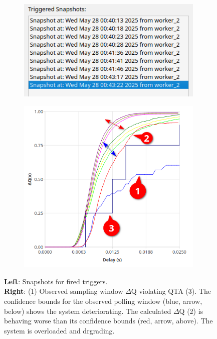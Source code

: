         \begin{figure}[H]
            \centering
            \begin{subfigure}{.5\textwidth}
                \centering
                \includegraphics[width=0.98\textwidth]{img/overload_2/snapshots.png}
                \label{fig:high_load_1}
            \end{subfigure}%
            \begin{subfigure}{.5\textwidth}
                \centering
                \includegraphics[width =0.98\textwidth]{img/overload_2/qta_triggerd2.png}
                \label{fig:high_load_2}
            \end{subfigure}
            \caption{\textbf{Left}: Snapshots for fired triggers. \\
            \textbf{Right}: (1) Observed sampling window $\Delta$Q violating QTA (3). The confidence bounds for the observed polling window (blue, arrow, below) shows the system deteriorating. The calculated $\Delta$Q (2) is behaving worse than its confidence bounds (red, arrow, above). The system is overloaded and drgrading.} %

            \label{fig:early_ov}
        \end{figure}


